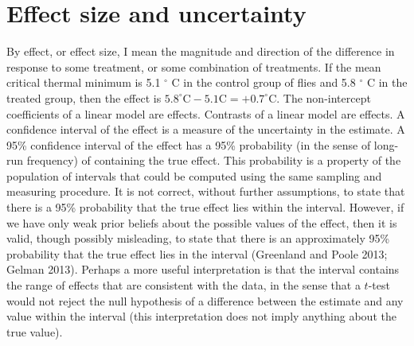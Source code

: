 \documentclass[]{article}
\theoremstyle{definition}
\theoremstyle{definition}
\theoremstyle{definition}
\theoremstyle{remark}
\begin{document}
\section*{Effect size and
uncertainty}\label{effect-size-and-uncertainty}

By effect, or effect size, I mean the magnitude and direction of the
difference in response to some treatment, or some combination of
treatments. If the mean critical thermal minimum is 5.1 \(^\circ\) C in
the control group of flies and 5.8 \(^\circ\) C in the treated group,
then the effect is
\(5.8 ^\circ \textrm{C} - 5.1 \textrm{C} = +0.7 ^\circ \textrm{C}\). The
non-intercept coefficients of a linear model are effects. Contrasts of a
linear model are effects. A confidence interval of the effect is a
measure of the uncertainty in the estimate. A 95\% confidence interval
of the effect has a 95\% probability (in the sense of long-run
frequency) of containing the true effect. This probability is a property
of the population of intervals that could be computed using the same
sampling and measuring procedure. It is not correct, without further
assumptions, to state that there is a 95\% probability that the true
effect lies within the interval. However, if we have only weak prior
beliefs about the possible values of the effect, then it is valid,
though possibly misleading, to state that there is an approximately 95\%
probability that the true effect lies in the interval (Greenland and
Poole 2013; Gelman 2013). Perhaps a more useful interpretation is that
the interval contains the range of effects that are consistent with the
data, in the sense that a \(t\)-test would not reject the null
hypothesis of a difference between the estimate and any value within the
interval (this interpretation does not imply anything about the true
value).
\end{document}
